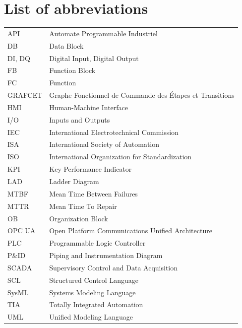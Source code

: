\documentclass[11pt,a4paper]{report}
\begin{document}
	\chapter*{List of abbreviations}
	\begin{tabular}{@{}p{3cm}p{11.5cm}@{}}
		API & Automate Programmable Industriel\\
		DB & Data Block\\
		DI, DQ & Digital Input, Digital Output\\
		FB & Function Block\\
		FC & Function\\
		GRAFCET & Graphe Fonctionnel de Commande des Étapes et Transitions\\
		HMI & Human-Machine Interface\\
		I/O & Inputs and Outputs\\
		IEC & International Electrotechnical Commission\\
		ISA & International Society of Automation\\
		ISO & International Organization for Standardization\\
		KPI & Key Performance Indicator\\
		LAD & Ladder Diagram\\
		MTBF & Mean Time Between Failures\\
		MTTR & Mean Time To Repair\\
		OB & Organization Block\\
		OPC UA & Open Platform Communications Unified Architecture\\
		PLC & Programmable Logic Controller\\
		P\&ID & Piping and Instrumentation Diagram\\
		SCADA & Supervisory Control and Data Acquisition\\
		SCL & Structured Control Language\\
		SysML & Systems Modeling Language\\
		TIA & Totally Integrated Automation\\
		UML & Unified Modeling Language\\
	\end{tabular}
	
	
	\makeatletter
	\def\toprule{\hline}
	\def\midrule{\hline}
	\def\bottomrule{\hline}
	\makeatother
	
\end{document}
